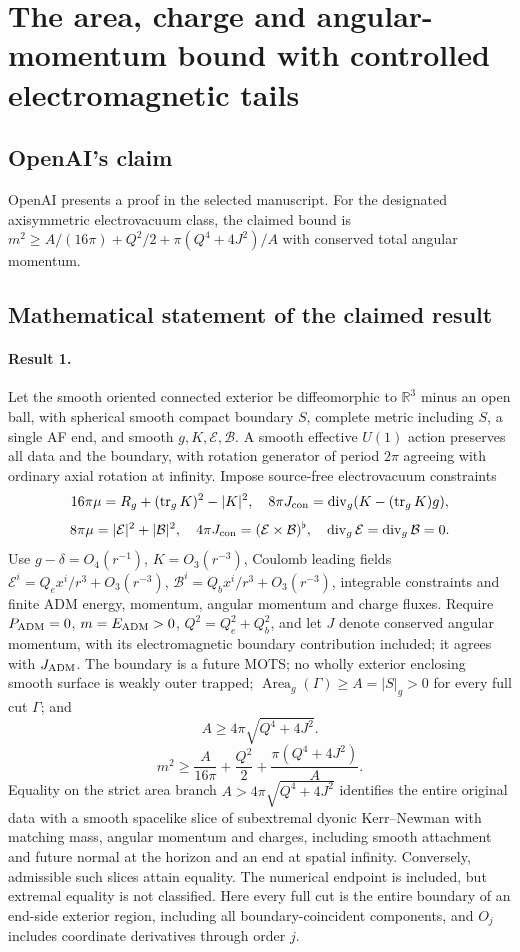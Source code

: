 \documentclass[11pt]{article}
\begin{document}
\section*{The area, charge and angular-momentum bound with controlled electromagnetic tails}

\subsection{OpenAI's claim}
OpenAI presents a proof in the selected manuscript. For the designated axisymmetric electrovacuum class, the claimed bound is $m^2\geq A/(16\pi)+Q^2/2+\pi(Q^4+4J^2)/A$ with conserved total angular momentum.

\subsection{Mathematical statement of the claimed result}
\paragraph{Result 1.} Let the smooth oriented connected exterior be diffeomorphic to \(\mathbb R^3\) minus an open ball, with spherical smooth compact boundary \(S\), complete metric including \(S\), a single AF end, and smooth \(g,K,\mathcal E,\mathcal B\). A smooth effective \(U(1)\) action preserves all data and the boundary, with rotation generator of period \(2\pi\) agreeing with ordinary axial rotation at infinity. Impose source-free electrovacuum constraints
\[
16\pi\mu=R_g+(\operatorname{tr}_gK)^2-|K|^2,
\quad 8\pi J_{\rm con}=\operatorname{div}_g(K-(\operatorname{tr}_gK)g),
\]
\[
8\pi\mu=|\mathcal E|^2+|\mathcal B|^2,\quad
4\pi J_{\rm con}=(\mathcal E\times\mathcal B)^\flat,\quad
\operatorname{div}_g\mathcal E=\operatorname{div}_g\mathcal B=0.
\]
Use \(g-\delta=O_4(r^{-1})\), \(K=O_3(r^{-3})\), Coulomb leading fields
\(\mathcal E^i=Q_e x^i/r^3+O_3(r^{-3})\), \(\mathcal B^i=Q_b x^i/r^3+O_3(r^{-3})\), integrable constraints and finite ADM energy, momentum, angular momentum and charge fluxes. Require \(P_{\rm ADM}=0\), \(m=E_{\rm ADM}>0\), \(Q^2=Q_e^2+Q_b^2\), and let \(J\) denote conserved angular momentum, with its electromagnetic boundary contribution included; it agrees with \(J_{\rm ADM}\). The boundary is a future MOTS; no wholly exterior enclosing smooth surface is weakly outer trapped; \(\operatorname{Area}_g(\Gamma)\ge A=|S|_g>0\) for every full cut \(\Gamma\); and
\[A\ge4\pi\sqrt{Q^4+4J^2}.\]
\[
m^2\ge\frac{A}{16\pi}+\frac{Q^2}{2}+\frac{\pi(Q^4+4J^2)}{A}.
\]
Equality on the strict area branch \(A>4\pi\sqrt{Q^4+4J^2}\) identifies the entire original data with a smooth spacelike slice of subextremal dyonic Kerr--Newman with matching mass, angular momentum and charges, including smooth attachment and future normal at the horizon and an end at spatial infinity. Conversely, admissible such slices attain equality. The numerical endpoint is included, but extremal equality is not classified. Here every full cut is the entire boundary of an end-side exterior region, including all boundary-coincident components, and $O_j$ includes coordinate derivatives through order $j$.
\end{document}
